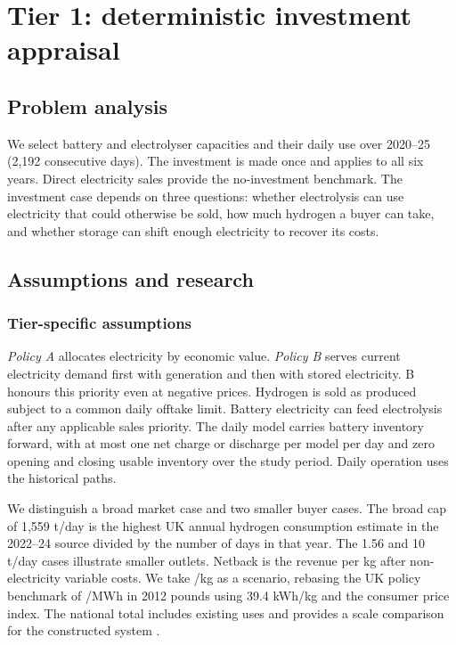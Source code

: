 \chapter{Tier 1: deterministic investment appraisal}\label{chap:tier1}
\section{Problem analysis}\label{sec:problem1}
We select battery and electrolyser capacities and their daily use over
2020--25 (2,192 consecutive days). The investment is made once and applies
to all six years. Direct electricity sales provide the no-investment
benchmark. The investment case depends on three questions: whether
electrolysis can use electricity that could otherwise be sold, how much
hydrogen a buyer can take, and whether storage can shift enough electricity
to recover its costs.

\section{Assumptions and research}\label{sec:research1}
\subsection{Tier-specific assumptions}
\emph{Policy A} allocates electricity by economic value.
\emph{Policy B} serves current electricity demand first with generation
and then with stored electricity. B honours this priority even at negative
prices. Hydrogen is sold as produced subject to a common daily offtake limit.
Battery electricity can feed electrolysis after any applicable sales
priority. The daily model carries battery inventory forward, with at most
one net charge or discharge per model per day and zero opening and closing usable
inventory over the study period. Daily operation uses the historical paths.

We distinguish a broad market case and two smaller buyer cases.
The broad cap of 1,559 t/day is the highest UK annual hydrogen consumption
estimate in the 2022--24 source divided by the number of days in that year.
The 1.56 and 10 t/day cases illustrate smaller outlets.
Netback is the revenue per kg after non-electricity variable costs.
We take /kg as a scenario, rebasing the UK policy benchmark of
/MWh in 2012 pounds using 39.4 kWh/kg and the consumer price index.
The national total includes existing uses and provides a scale comparison
for the constructed system \cite{har,eho,cpi,basis}.


